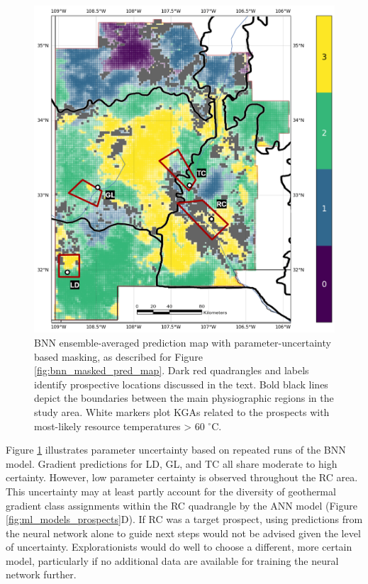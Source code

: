 \begin{figure}
\centering
\includegraphics[width=.75\textwidth]{templates/images/Figure-BNN_All_Gradient_Map_Masked_Prospect_Zones.png}
\caption[Parameter uncertainty map with prospective areas]
{BNN ensemble-averaged prediction map with parameter-uncertainty based masking, as described for Figure \ref{fig:bnn_masked_pred_map}. Dark red quadrangles and labels identify prospective locations discussed in the text. Bold black lines depict the boundaries between the main physiographic regions in the study area. White markers plot KGAs related to the prospects with most-likely resource temperatures > 60 $^\circ$C.}
\label{fig:param_uncertainty_prospects}
\end{figure}

Figure \ref{fig:param_uncertainty_prospects} illustrates parameter uncertainty based on repeated runs of the BNN model. Gradient predictions for LD, GL, and TC all share moderate to high certainty. However, low parameter certainty is observed throughout the RC area. This uncertainty may at least partly account for the diversity of geothermal gradient class assignments within the RC quadrangle by the ANN model (Figure \ref{fig:ml_models_prospects}D). If RC was a target prospect, using predictions from the neural network alone to guide next steps would not be advised given the level of uncertainty. Explorationists would do well to choose a different, more certain model, particularly if no additional data are available for training the neural network further.

